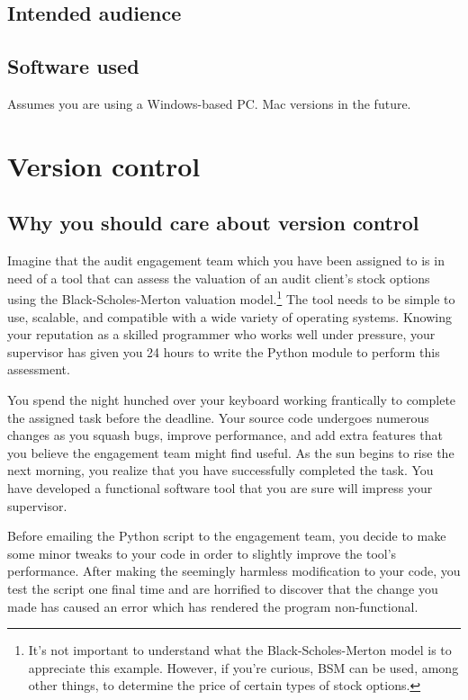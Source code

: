 \documentclass{book}
\begin{document}
\section{Intended audience}
\section{Software used}
Assumes you are using a Windows-based PC. Mac versions in the future.


\chapter{Version control}
\section{Why you should care about version control}

Imagine that the audit engagement team which you have been assigned to is in need of a tool that can assess the valuation of an audit client's stock options using the Black-Scholes-Merton valuation model.\footnote{It's not important to understand what the Black-Scholes-Merton model is to appreciate this example. However, if you're curious, BSM can be used, among other things, to determine the price of certain types of stock options.} The tool needs to be simple to use, scalable, and compatible with a wide variety of operating systems. Knowing your reputation as a skilled programmer who works well under pressure, your supervisor has given you 24 hours to write the Python module to perform this assessment.

You spend the night hunched over your keyboard working frantically to complete the assigned task before the deadline. Your source code undergoes numerous changes as you squash bugs, improve performance, and add extra features that you believe the engagement team might find useful. As the sun begins to rise the next morning, you realize that you have successfully completed the task. You have developed a functional software tool that you are sure will impress your supervisor. 

Before emailing the Python script to the engagement team, you decide to make some minor tweaks to your code in order to slightly improve the tool's performance. After making the seemingly harmless modification to your code, you test the script one final time and are horrified to discover that the change you made has caused an error which has rendered the program non-functional.
\end{document}
